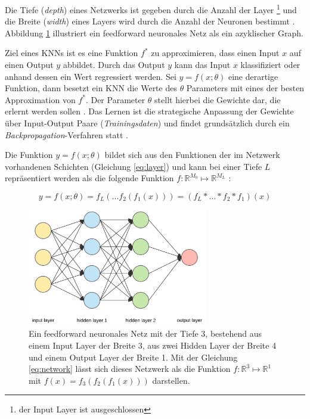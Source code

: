 Die Tiefe (\textit{depth}) eines Netzwerks ist gegeben durch die Anzahl der Layer \footnote{der Input Layer ist ausgeschlossen} und die Breite (\textit{width}) eines Layers wird durch die Anzahl der Neuronen bestimmt \cite{Goodfellow-et-al-2016}. 
Abbildung \ref{fig:neural_net} illustriert ein feedforward neuronales Netz als ein azyklischer Graph.

Ziel eines KNNs ist es eine Funktion $f^*$ zu approximieren, dass einen Input $x$ auf einen Output $y$ abbildet. Durch das Output $y$ kann das Input $x$ klassifiziert oder anhand dessen ein Wert regressiert werden. Sei $y = f(x; \theta)$ eine derartige Funktion, dann besetzt ein KNN die Werte des $\theta$ Parameters mit eines der besten Approximation von $f^*$. Der Parameter $\theta$ stellt hierbei die Gewichte dar, die erlernt werden sollen \cite{Goodfellow-et-al-2016}. 
Das Lernen ist die strategische Anpassung der Gewichte über Input-Output Paare (\textit{Trainingsdaten}) und findet grundsätzlich durch ein \textit{Backpropagation}-Verfahren statt \cite{Goodfellow-et-al-2016}. 

Die Funktion $y = f(x; \theta)$ bildet sich aus den Funktionen der im Netzwerk vorhandenen Schichten (Gleichung \ref{eq:layer}) und kann bei einer Tiefe $L$ repräsentiert werden als die folgende Funktion $f :  \mathbb{R}^{M_0} \mapsto \mathbb{R}^{M_L}$ \cite{Goodfellow-et-al-2016, bauckhageInformedMachineLearning}:
 
\begin{equation}
\label{eq:network}
y = f(x; \theta)=  f_L(...f_2(f_1(x))) = (f_L * ... * f_2 * f_1)(x)
\end{equation}


\begin{figure}
	\centering
	\includegraphics[width=0.7\textwidth]{images/ann_conv/neural_net.png}
	\caption{Ein feedforward neuronales Netz mit der Tiefe 3, bestehend aus einem Input Layer der Breite 3, aus zwei Hidden Layer der Breite 4 und einem Output Layer der Breite 1. Mit der Gleichung \ref{eq:network} lässt sich dieses Netzwerk als die Funktion $f :  \mathbb{R}^{3} \mapsto \mathbb{R}^{1}$ mit $f(x)=f_3(f_2(f_1(x)))$ darstellen. }
	\label{fig:neural_net}
\end{figure}

